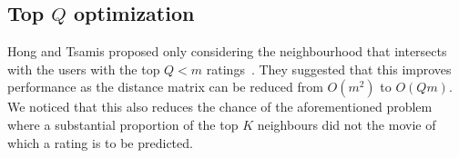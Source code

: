 \documentclass[final]{cvpr}
\begin{document}
\subsection{Top $Q$ optimization}
Hong and Tsamis proposed only considering the neighbourhood
that intersects with the users with the top $Q < m$ ratings~\cite{Alpher01}.
They suggested that this improves performance as
the distance matrix can be reduced from $O(m^2)$ to $O(Qm)$.
We noticed that this also reduces the chance of the aforementioned problem
where a substantial proportion of the top $K$ neighbours did not the movie
of which a rating is to be predicted.

{\small
	
	
}
\end{document}
